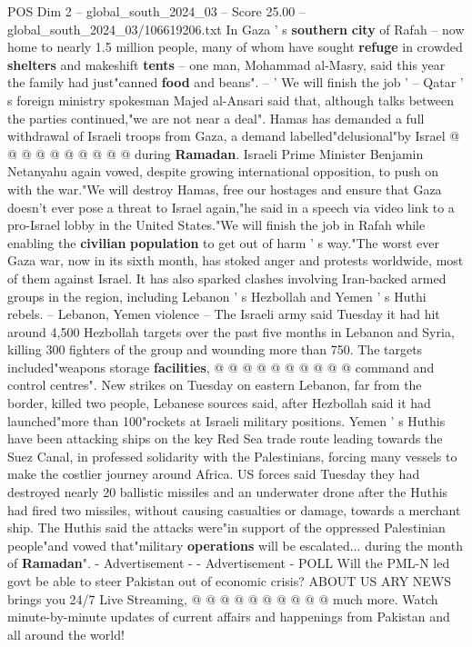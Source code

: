 \begin{textsample}{POS Dim 2 – global\_south\_2024\_03 – Score 25.00 – global\_south\_2024\_03/106619206.txt}
In Gaza ' s \textbf{southern} \textbf{city} of Rafah -- now home to nearly 1.5 million people, many of whom have sought \textbf{refuge} in crowded \textbf{shelters} and makeshift \textbf{tents} -- one man, Mohammad al-Masry, said this year the family had just"canned \textbf{food} and beans". -- ' We will finish the job ' -- Qatar ' s foreign ministry spokesman Majed al-Ansari said that, although talks between the parties continued,"we are not near a deal".
Hamas has demanded a full withdrawal of Israeli troops from Gaza, a demand labelled"delusional"by Israel @ @ @ @ @ @ @ @ @ @ during \textbf{Ramadan}.
Israeli Prime Minister Benjamin Netanyahu again vowed, despite growing international opposition, to push on with the war."We will destroy Hamas, free our hostages and ensure that Gaza doesn't ever pose a threat to Israel again,"he said in a speech via video link to a pro-Israel lobby in the United States."We will finish the job in Rafah while enabling the \textbf{civilian} \textbf{population} to get out of harm ' s way."The worst ever Gaza war, now in its sixth month, has stoked anger and protests worldwide, most of them against Israel.
It has also sparked clashes involving Iran-backed armed groups in the region, including Lebanon ' s Hezbollah and Yemen ' s Huthi rebels. -- Lebanon, Yemen violence -- The Israeli army said Tuesday it had hit around 4,500 Hezbollah targets over the past five months in Lebanon and Syria, killing 300 fighters of the group and wounding more than 750.
The targets included"weapons storage \textbf{facilities}, @ @ @ @ @ @ @ @ @ @ command and control centres".
New strikes on Tuesday on eastern Lebanon, far from the border, killed two people, Lebanese sources said, after Hezbollah said it had launched"more than 100"rockets at Israeli military positions.
Yemen ' s Huthis have been attacking ships on the key Red Sea trade route leading towards the Suez Canal, in professed solidarity with the Palestinians, forcing many vessels to make the costlier journey around Africa.
US forces said Tuesday they had destroyed nearly 20 ballistic missiles and an underwater drone after the Huthis had fired two missiles, without causing casualties or damage, towards a merchant ship.
The Huthis said the attacks were"in support of the oppressed Palestinian people"and vowed that"military \textbf{operations} will be escalated... during the month of \textbf{Ramadan}". - Advertisement - - Advertisement - POLL Will the PML-N led govt be able to steer Pakistan out of economic crisis?
ABOUT US ARY NEWS brings you 24/7 Live Streaming, @ @ @ @ @ @ @ @ @ @ much more.
Watch minute-by-minute updates of current affairs and happenings from Pakistan and all around the world!

\end{textsample}
